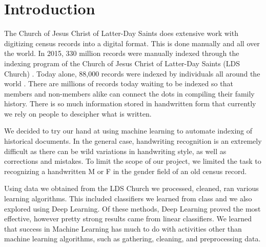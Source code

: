 \section{Introduction}



The Church of Jesus Christ of Latter-Day Saints does extensive work with digitizing census records into a digital format.  This is done manually and all over the world.
In 2015, 330 million records were manually indexed through the indexing program of the Church of Jesus Christ of Latter-Day Saints (LDS Church) \cite{web:indexingStats}.
Today alone, 88,000 records were indexed by individuals all around the world \cite{web:indexingStats}.
There are millions of records today waiting to be indexed so that members and non-members alike can connect the dots in compiling their family history.
There is so much information stored in handwritten form that currently we rely on people to descipher what is written.

We decided to try our hand at using machine learning to automate indexing of historical documents.  In the general case, handwriting recognition is an extremely difficult as there can be wild variations in handwriting style, as well as corrections and mistakes.  To limit the scope of our project, we limited the task to recognizing a handwritten M or F in the gender field of an old census record.

Using data we obtained from the LDS Church we processed, cleaned, ran various learning algorithms.  This included classifiers we learned from class and we also explored using Deep Learning.  Of these methods, Deep Learning proved the most effective, however pretty strong results came from linear classifiers.  We learned that success in Machine Learning has much to do with activities other than machine learning algorithms, such as gathering, cleaning, and preprocessing data.

